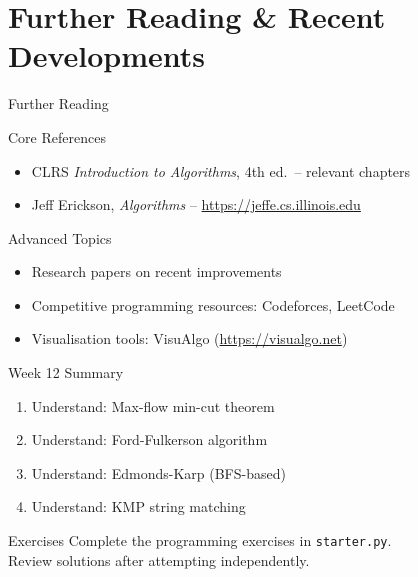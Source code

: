 \documentclass[aspectratio=169,xcolor=dvipsnames]{beamer}
\begin{document}
\section{Further Reading \& Recent Developments}
\begin{frame}{Further Reading}
  \begin{block}{Core References}
    \begin{itemize}
      \item CLRS \textit{Introduction to Algorithms}, 4th ed.\ -- relevant chapters
      \item Jeff Erickson, \textit{Algorithms} -- \url{https://jeffe.cs.illinois.edu}
    \end{itemize}
  \end{block}
  \begin{exampleblock}{Advanced Topics}
    \begin{itemize}
      \item Research papers on recent improvements
      \item Competitive programming resources: Codeforces, LeetCode
      \item Visualisation tools: VisuAlgo (\url{https://visualgo.net})
    \end{itemize}
  \end{exampleblock}
\end{frame}

\begin{frame}{Week 12 Summary}
  \begin{enumerate}
    \item Understand: Max-flow min-cut theorem
    \item Understand: Ford-Fulkerson algorithm
    \item Understand: Edmonds-Karp (BFS-based)
    \item Understand: KMP string matching
  \end{enumerate}
  \begin{block}{Exercises}
    Complete the programming exercises in \texttt{starter.py}.\\
    Review solutions after attempting independently.
  \end{block}
\end{frame}
\end{document}
